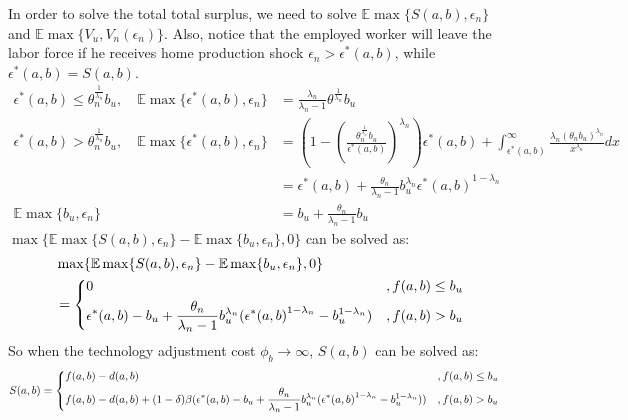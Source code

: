 \documentclass{article}
\newcommand{\E}{\mathbb{E}}
\newcommand{\1}{\mathbb{1}}
\begin{document}
In order to solve the total total surplus, we need to solve $\E\max\{S(a,b),\epsilon_n\}$ and $\E\max\{V_u,V_n(\epsilon_n)\}$. Also, notice that the employed worker will leave the labor force if he receives home production shock $\epsilon_n>\epsilon^*(a,b)$, while $\epsilon^*(a,b) = S(a,b)$. 
\begin{align*}
\epsilon^*(a,b)\leq\theta_n^{\frac{1}{\lambda_n}}b_u, \quad \E\max\{\epsilon^*(a,b),\epsilon_n\} &= \frac{\lambda_n}{\lambda_n-1}\theta^{\frac{1}{\lambda_n}}b_u \\
\epsilon^*(a,b)>\theta_n^{\frac{1}{\lambda_n}}b_u, \quad \E\max\{\epsilon^*(a,b),\epsilon_n\} &= (1-(\frac{\theta_n^{\frac{1}{\lambda_n}}b_u}{\epsilon^*(a,b)})^{\lambda_n})\epsilon^*(a,b)+\int_{\epsilon^*(a,b)}^{\infty}\frac{\lambda_n(\theta_n b_u)^{\lambda_n}}{x^{\lambda_n}}dx \\
												&= \epsilon^*(a,b)+\frac{\theta_n}{\lambda_n-1}b_u^{\lambda_n}{\epsilon^*(a,b)}^{1-\lambda_n} \\		
\E\max\{b_u,\epsilon_n\} &= b_u +\frac{\theta_n}{\lambda_n-1}b_u 
\end{align*}	
$\max\{\E\max\{S(a,b),\epsilon_n\}-\E\max\{b_u,\epsilon_n\},0 \} $ can be solved as: 
\begin{align*}
&\max\{\E\max\{S(a,b),\epsilon_n\}-\E\max\{b_u,\epsilon_n\},0 \}   \\
&= \begin{dcases}
0 & ,f(a,b) \leq b_u \\
\epsilon^*(a,b)-b_u +\frac{\theta_n}{\lambda_n-1}b_u^{\lambda_n}({\epsilon^*(a,b)}^{1-\lambda_n}-b_u^{1-\lambda_n}) & ,f(a,b)>b_u 
\end{dcases}
\end{align*}	
So when the technology adjustment cost $\phi_b \to \infty$, $S(a,b)$ can be solved as:
\begin{align*}
S(a,b) 
&= \begin{dcases}
f(a,b)-d(a,b) & ,f(a,b)  \leq b_u \\
f(a,b)-d(a,b)+(1-\delta)\beta(\epsilon^*(a,b)-b_u +\frac{\theta_n}{\lambda_n-1}b_u^{\lambda_n}({\epsilon^*(a,b)}^{1-\lambda_n}-b_u^{1-\lambda_n})) & ,f(a,b)>b_u 
\end{dcases}
\end{align*}	
\end{document}
